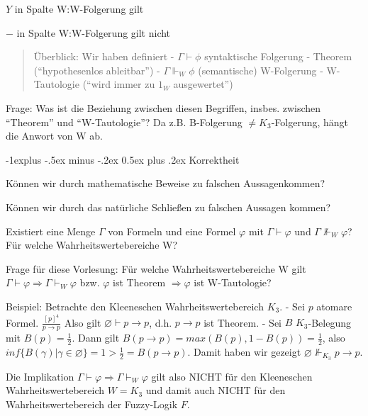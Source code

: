\documentclass[a4paper]{article}
\makeatletter
\renewcommand{\subsection}{\@startsection{subsection}{2}{0mm}%
                {-1explus -.5ex minus -.2ex}%
                {0.5ex plus .2ex}%
                {\normalfont\normalsize\bfseries}}
\makeatother
\begin{document}
\begin{multicols}{3}
  \begin{itemize*}
    \itemsep1pt\parskip0pt
    \item
          $Y$ in Spalte W:W-Folgerung gilt
    \item
          $-$ in Spalte W:W-Folgerung gilt nicht
  \end{itemize*}

  \begin{quote}
    Überblick: Wir haben definiert - $\Gamma\vdash\phi$ syntaktische
    Folgerung - Theorem (``hypothesenlos ableitbar'') -
    $\Gamma\Vdash_W \phi$ (semantische) W-Folgerung - W-Tautologie (``wird
    immer zu $1_W$ ausgewertet'')
  \end{quote}

  Frage: Was ist die Beziehung zwischen diesen Begriffen, insbes. zwischen
  ``Theorem'' und ``W-Tautologie''? Da z.B. B-Folgerung
  $\not =K_3$-Folgerung, hängt die Anwort von W ab.

  \subsection{Korrektheit}\label{korrektheit}

  Können wir durch mathematische Beweise zu falschen Aussagenkommen?

  Können wir durch das natürliche Schließen zu falschen Aussagen kommen?

  Existiert eine Menge $\Gamma$ von Formeln und eine Formel $\varphi$ mit
  $\Gamma\vdash\varphi$ und $\Gamma\not\Vdash_W \varphi$? Für welche
  Wahrheitswertebereiche W?

  Frage für diese Vorlesung: Für welche Wahrheitswertebereiche W gilt
  $\Gamma\vdash\varphi\Rightarrow\Gamma\vdash_W \varphi$ bzw. $\varphi$
  ist Theorem $\Rightarrow\varphi$ ist W-Tautologie?

  Beispiel: Betrachte den Kleeneschen Wahrheitswertebereich $K_3$. - Sei
  $p$ atomare Formel. $\frac{[p]^4}{p\rightarrow p}$ Also gilt
  $\varnothing\vdash p\rightarrow p$, d.h. $p\rightarrow p$ ist Theorem. -
  Sei $B$ $K_3$-Belegung mit $B(p)=\frac{1}{2}$. Dann gilt
  $B(p\rightarrow p) = max(B(p), 1-B(p)) =\frac{1}{2}$, also
  $inf\{B(\gamma)|\gamma\in\varnothing\}= 1 >\frac{1}{2} = B(p\rightarrow p)$.
  Damit haben wir gezeigt $\varnothing\not\Vdash_{K_3} p\rightarrow p$.

  Die Implikation $\Gamma\vdash\varphi\Rightarrow\Gamma\vdash_W \varphi$
  gilt also NICHT für den Kleeneschen Wahrheitswertebereich $W=K_3$ und
  damit auch NICHT für den Wahrheitswertebereich der Fuzzy-Logik $F$.


\end{multicols}
\end{document}
